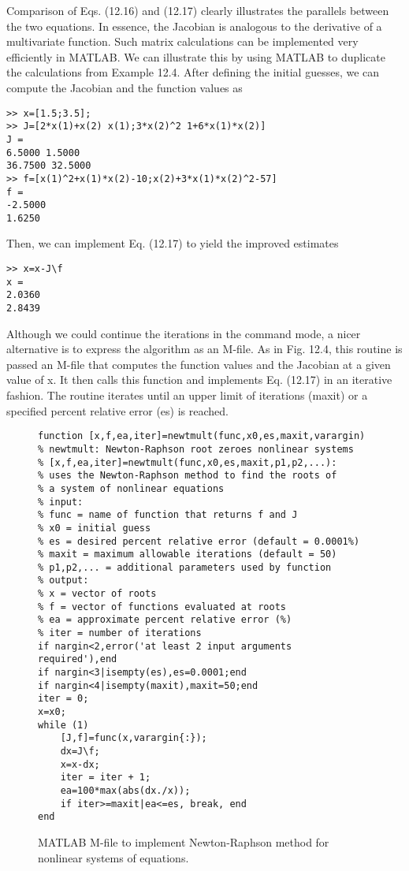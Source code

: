 \documentclass[../main.tex]{subfiles}
\begin{document}
Comparison of Eqs. (12.16) and (12.17) clearly illustrates the parallels between the
two equations. In essence, the Jacobian is analogous to the derivative of a multivariate
function.
Such matrix calculations can be implemented very efficiently in MATLAB. We can
illustrate this by using MATLAB to duplicate the calculations from Example 12.4. After
defining the initial guesses, we can compute the Jacobian and the function values as

\begin{lstlisting}[numbers=none]
>> x=[1.5;3.5];
>> J=[2*x(1)+x(2) x(1);3*x(2)^2 1+6*x(1)*x(2)]
J =
6.5000 1.5000
36.7500 32.5000
>> f=[x(1)^2+x(1)*x(2)-10;x(2)+3*x(1)*x(2)^2-57]
f =
-2.5000
1.6250
\end{lstlisting}

Then, we can implement Eq. (12.17) to yield the improved estimates

\begin{lstlisting}[numbers=none]
>> x=x-J\f
x =
2.0360
2.8439
\end{lstlisting}

Although we could continue the iterations in the command mode, a nicer alternative is
to express the algorithm as an M-file. As in Fig. 12.4, this routine is passed an M-file that
computes the function values and the Jacobian at a given value of x. It then calls this function and implements Eq. (12.17) in an iterative fashion. The routine iterates until an upper
limit of iterations (maxit) or a specified percent relative error (es) is reached.

\begin{figure}
\begin{lstlisting}[numbers=none]
function [x,f,ea,iter]=newtmult(func,x0,es,maxit,varargin)
% newtmult: Newton-Raphson root zeroes nonlinear systems
% [x,f,ea,iter]=newtmult(func,x0,es,maxit,p1,p2,...):
% uses the Newton-Raphson method to find the roots of
% a system of nonlinear equations
% input:
% func = name of function that returns f and J
% x0 = initial guess
% es = desired percent relative error (default = 0.0001%)
% maxit = maximum allowable iterations (default = 50)
% p1,p2,... = additional parameters used by function
% output:
% x = vector of roots
% f = vector of functions evaluated at roots
% ea = approximate percent relative error (%)
% iter = number of iterations
if nargin<2,error('at least 2 input arguments required'),end
if nargin<3|isempty(es),es=0.0001;end
if nargin<4|isempty(maxit),maxit=50;end
iter = 0;
x=x0;
while (1)
	[J,f]=func(x,varargin{:});
	dx=J\f;
	x=x-dx;
	iter = iter + 1;
	ea=100*max(abs(dx./x));
	if iter>=maxit|ea<=es, break, end
end
\end{lstlisting}
\caption{\textsf{MATLAB M-file to implement Newton-Raphson method for nonlinear systems of equations.}}
\end{figure}
\end{document}
